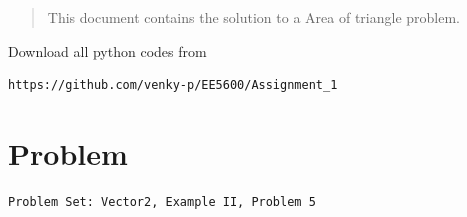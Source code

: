 \documentclass[journal,12pt,twocolumn]{IEEEtran}
\begin{document}
\maketitle

\renewcommand{\thefigure}{\theenumi}
\renewcommand{\thetable}{\theenumi}


\begin{abstract}
This document contains the solution to a Area of triangle problem.
\end{abstract}
%
Download all python codes from 
%
\begin{lstlisting}
https://github.com/venky-p/EE5600/Assignment_1
\end{lstlisting}

%

\section{Problem}
\begin{lstlisting}
Problem Set: Vector2, Example II, Problem 5
\end{lstlisting}
\renewcommand{\theequation}{\theenumi}
\end{document}
